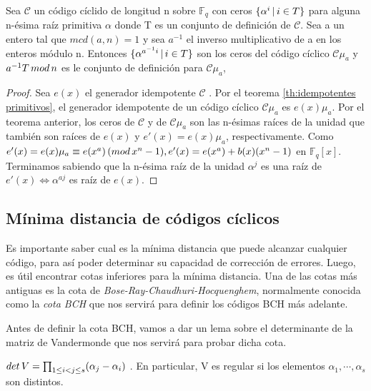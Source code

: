 \begin{corollary}
Sea $\mathcal{C}$ un código cíclido de longitud n sobre $\mathbb{F}_q$ con ceros $\{ \alpha^i \thinspace | \thinspace i \in T \}$ para alguna n-ésima raíz primitiva $\alpha$ donde T es un conjunto de definición de $\mathcal{C}$. Sea a un entero tal que $mcd(a,n)=1$ y sea $a^{-1}$ el inverso multiplicativo de a en los enteros módulo n. Entonces  $\{ \alpha^{a^{-1}i} \thinspace | \thinspace i \in T \}$ son los ceros del código cíclico  $\mathcal{C}\mu_a$ y $a^{-1}T \thinspace mod \thinspace n$ es le conjunto de definición para $\mathcal{C}\mu_a$,
\end{corollary}

 \begin{proof}
 Sea $e(x)$ el generador idempotente $\mathcal{C}$ . Por el teorema \ref{th:idempotentes primitivos}, el generador idempotente de un código cíclico $\mathcal{C}\mu_a$ es $e(x)\mu_a$. Por el teorema anterior, los ceros de $\mathcal{C}$  y de $\mathcal{C}\mu_a$ son las n-ésimas raíces de la unidad que también son raíces de $e(x)$ y $e'(x) = e(x)\mu_a$, respectivamente. Como  $e'(x) = e(x)\mu_a \equiv e(x^a) \thinspace (mod \thinspace x^n-1), e'(x) = e(x^a) + b(x)(x^n-1)$ en $\mathbb{F}_q[x]$. Terminamos sabiendo que la n-ésima raíz de la unidad $\alpha^j$ es una raíz de $e'(x) \Leftrightarrow \alpha^{aj}$ es raíz de $e(x)$.
 \end{proof}
 
 
 
 
 
 \subsection{Mínima distancia de códigos cíclicos}
 
 Es importante saber cual es la mínima distancia que puede alcanzar cualquier código, para así poder determinar su capacidad de corrección de errores. Luego, es útil encontrar cotas inferiores para la mínima distancia. Una de las cotas más antiguas es la cota de \textit{Bose-Ray-Chaudhuri-Hocquenghem}, normalmente conocida como la \textit{cota BCH} que nos servirá para definir los códigos BCH más adelante. 
 
 Antes de definir la cota BCH, vamos a dar un lema sobre el determinante de la matriz de Vandermonde que nos servirá para probar dicha cota.
 
 \begin{lemma}
 \label{le:vandermonde}
 $det \thinspace V = \prod_{1 \leq i < j \leq s} (\alpha_j - \alpha_i)$ . En particular, V es regular si los elementos $\alpha_1, \cdots, \alpha_s$ son distintos.
 \end{lemma}


